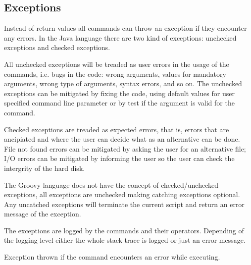 \subsection{Exceptions}

Instead of return values all commands can throw an exception if they encounter
any errors. In the Java language there are two kind of exceptions:
unchecked exceptions and checked exceptions.

All unchecked exceptions will be treaded as user errors in the usage of the
commands, i.e. bugs in the code: wrong arguments,  values for mandatory arguments,
wrong type of arguments, syntax errors, and so on. The unchecked exceptions
can be mitigated by fixing the code, using default values for user specified 
command line parameter or by test if the argument is valid for the command.

Checked exceptions are treaded as expected errors, that is, errors that are ancipiated
and where the user can decide what as an alternative can be done. File not found
errors can be mitigated by asking the user for an alternative file; I/O errors
can be mitigated by informing the user so the user can check the intergrity
of the hard disk.

The Groovy language does not have the concept of checked/unchecked exceptions,
all exceptions are unchecked making catching exceptions optional. Any uncatched
exceptions will terminate the current script and return an error message of
the exception.

The exceptions are logged by the commands and their operators. Depending of the
logging level either the whole stack trace is logged or just an error message.

%

Exception thrown if the command encounters an error while executing.

%

